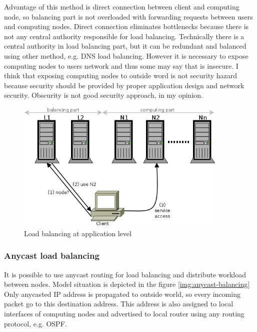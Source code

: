Advantage of this method is direct connection between client and computing node, so balancing part is not overloaded with forwarding requests between users and computing nodes. Direct connection eliminates bottlenecks because there is not any central authority responsible for load balancing. Technically there is a central authority in load balancing part, but it can be redundant and balanced using other method, e.g. \Ac{DNS} load balancing.  However it is necessary to expose computing nodes to users network and thus some may say that is insecure. I think that exposing computing nodes to outside word is not security hazard because security should be provided by proper application design and network security. Obscurity is not good security approach, in my opinion.

\begin{figure}[htb]
	\begin{center}
	\includegraphics[width=0.9\textwidth]{balancing-application.png}
	\end{center}
	\caption{Load balancing at application level}
	\label{img:balancing-application}
\end{figure}

\subsubsection{Anycast load balancing}
It is possible to use anycast routing for load balancing and distribute workload between nodes. Model situation is depicted in the figure \ref{img:anycast-balancing} Only anycasted \Ac{IP} address is propagated to outside world, so every incoming packet go to this destination address. This address is also assigned to local interfaces of computing nodes and advertised to local router using any routing protocol, e.g. \Ac{OSPF}. 

